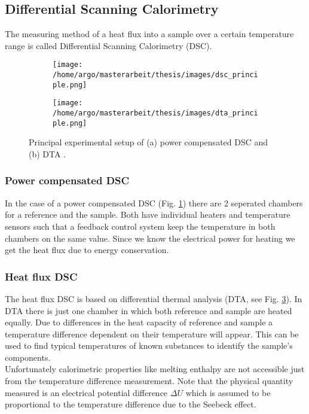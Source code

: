 \documentclass{scrartcl}[12pt, halfparskip]
\numberwithin{equation}{section}
\numberwithin{figure}{section}
\numberwithin{table}{section}
\begin{document}
\subsection{Differential Scanning Calorimetry}
\label{sec:physics_DSC}
The measuring method of a heat flux into a sample over a certain temperature range is called Differential Scanning Calorimetry (DSC). 

\begin{figure}[H]
	\centering
	\begin{subfigure}{0.49\textwidth}
		\texttt{[image: /home/argo/masterarbeit/thesis/images/dsc\_principle.png]}
		\caption{}
		\label{fig:DSC_power_compensated_principle}
	\end{subfigure}
	\begin{subfigure}{0.49\textwidth}
		\texttt{[image: /home/argo/masterarbeit/thesis/images/dta\_principle.png]}
		\caption{}
		\label{fig:DTA_principle}
	\end{subfigure}
	\caption{Principal experimental setup of (a) power compensated DSC and \\ (b) DTA \cite{DSC_buch}.}
\end{figure}


\subsubsection{Power compensated DSC}
In the case of a power compensated DSC (Fig. \ref{fig:DSC_power_compensated_principle}) there are 2 seperated chambers for a reference and the sample. Both have individual heaters and temperature sensors such that a feedback control system keep the temperature in both chambers on the same value. Since we know the electrical power for heating we get the heat flux due to energy conservation. \\



\subsubsection{Heat flux DSC}
The heat flux DSC is based on differential thermal analysis (DTA, see Fig. \ref{fig:DTA_principle}). 
In DTA there is just one chamber in which both reference and sample are heated equally. 
Due to differences in the heat capacity of reference and sample a temperature difference dependent on their temperature will appear.
This can be used to find typical temperatures of known substances to identify the sample's components. \\
Unfortunately calorimetric properties like melting enthalpy are not accessible just from the temperature difference measurement. 
Note that the physical quantity measured is an electrical potential difference $\Delta U$ which is assumed to be proportional to the temperature difference due to the Seebeck effect. \\
\end{document}
